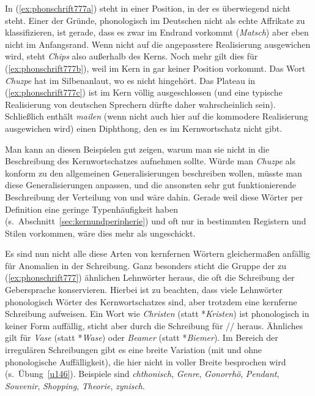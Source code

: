 In (\ref{ex:phonschrift777a}) steht \textipa{[\t{tS}]} in einer Position, in der es überwiegend nicht steht.
Einer der Gründe, phonologisch \textipa{[\t{tS}]} im Deutschen nicht als echte Affrikate zu klassifizieren, ist gerade, dass es zwar im Endrand vorkommt (\textit{Matsch}) aber eben nicht im Anfangsrand.
Wenn nicht auf die angepasstere Realisierung \textipa{[SIps]} ausgewichen wird, steht \textit{Chips} also außerhalb des Kerns.
Noch mehr gilt dies für (\ref{ex:phonschrift777b}), weil \textipa{[\t{dZ}]} im Kern in gar keiner Position vorkommt.
Das Wort \textit{Chuzpe} hat \textipa{[X]} im Silbenanlaut, wo es nicht hingehört.
Das Plateau \textipa{[pt]} in (\ref{ex:phonschrift777c}) ist im Kern völlig ausgeschlossen (und eine typische Realisierung von deutschen Sprechern dürfte daher wahrscheinlich \textipa{[p@tEKanodOn]} sein).
Schließlich enthält \textit{mailen} (wenn nicht auch hier auf die kommodere Realisierung \textipa{[me:l@n]} ausgewichen wird) einen Diphthong, den es im Kernwortschatz nicht gibt.

Man kann an diesen Beispielen gut zeigen, warum man sie nicht in die Beschreibung des Kernwortschatzes aufnehmen sollte.
Würde man \textit{Chuzpe} \zB als konform zu den allgemeinen Generalisierungen beschreiben wollen, müsste man diese Generalisierungen anpassen, und die ansonsten sehr gut funktionierende Beschreibung der Verteilung von \textipa{[\c{c}]} und \textipa{[X]} wäre dahin.
Gerade weil diese Wörter per Definition eine geringe Typenhäufigkeit haben (s.\ Abschnitt~\ref{sec:kernundperipherie}) und oft nur in bestimmten Registern und Stilen vorkommen, wäre dies mehr als ungeschickt.

Es sind nun nicht alle diese Arten von kernfernen Wörtern gleichermaßen anfällig für Anomalien in der Schreibung.
Ganz besonders sticht die Gruppe der zu (\ref{ex:phonschrift777}) ähnlichen Lehnwörter heraus, die oft die Schreibung der Gebersprache konservieren.
Hierbei ist zu beachten, dass viele Lehnwörter phonologisch Wörter des Kernwortschatzes sind, aber trotzdem eine kernferne Schreibung aufweisen.
Ein Wort wie \textit{Christen} (statt *\textit{Kristen}) ist phonologisch in keiner Form auffällig, sticht aber durch die Schreibung \textipa{[chr]} für // heraus.
Ähnliches gilt für \textit{Vase} (statt *\textit{Wase}) oder \textit{Beamer} (statt *\textit{Biemer}).
Im Bereich der irregulären Schreibungen gibt es eine breite Variation (mit und ohne phonologische Auffälligkeit), die hier nicht in voller Breite besprochen wird (s.\ Übung~\ref{u146}).
Beispiele sind \textit{chthonisch}, \textit{Genre}, \textit{Gonorrhö}, \textit{Pendant}, \textit{Souvenir}, \textit{Shopping}, \textit{Theorie}, \textit{zynisch}.

